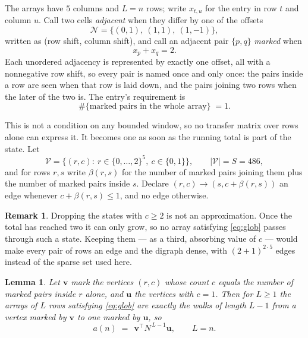 \documentclass[11pt,a4paper]{article}
\theoremstyle{plain}
\newtheorem{lemma}[theorem]{Lemma}
\theoremstyle{definition}
\newtheorem{remark}[theorem]{Remark}
\begin{document}
The arrays have $5$ columns and $L=n$ rows; write $x_{t,u}$ for the entry in
row $t$ and column $u$. Call two cells \emph{adjacent} when they differ by one of the
offsets
\[
\mathcal N=\{(0,1),\ (1,1),\ (1,-1)\},
\]
written as (row shift, column shift), and call an adjacent pair $\{p,q\}$
\emph{marked} when
\[
x_{p}+x_{q}=2 .
\]
Each unordered adjacency is represented by exactly one offset, all with a nonnegative row
shift, so every pair is named once and only once: the pairs inside a row are seen when
that row is laid down, and the pairs joining two rows when the later of the two is. The
entry's requirement is
\begin{equation}\label{eq:glob}
\#\{\text{marked pairs in the whole array}\}\;=1.
\end{equation}

This is not a condition on any bounded window, so no transfer matrix over rows alone can
express it. It becomes one as soon as the running total is part of the state. Let
\[
\mathcal V=\bigl\{(r,c):\ r\in\{0,\dots,2\}^{5},\ c\in\{0,1\}\bigr\},
\qquad |\mathcal V|=S=486,
\]
and for rows $r,s$ write $\beta(r,s)$ for the number of marked pairs joining them plus the
number of marked pairs inside $s$. Declare $(r,c)\to(s,c+\beta(r,s))$ an edge whenever
$c+\beta(r,s)\le1$, and no edge otherwise.

\begin{remark}
Dropping the states with $c\ge2$ is not an approximation. Once the total has reached two it
can only grow, so no array satisfying \eqref{eq:glob} passes through such a state. Keeping
them --- as a third, absorbing value of $c$ --- would make every pair of rows an edge and
the digraph dense, with $(2+1)^{2\cdot5}$ edges instead of the sparse set used here.
\end{remark}

\begin{lemma}\label{lem:walk}
Let $\mathbf{v}$ mark the vertices $(r,c)$ whose count $c$ equals the number of marked pairs
inside $r$ alone, and $\mathbf{u}$ the vertices with $c=1$. Then for $L\ge1$ the arrays
of $L$ rows satisfying \eqref{eq:glob} are exactly the walks of length $L-1$ from a
vertex marked by $\mathbf{v}$ to one marked by $\mathbf{u}$, so
\[
a(n)\;=\;\,\mathbf{v}^{\!\top}N^{\,L-1}\mathbf{u},\qquad L=n .
\]
\end{lemma}
\end{document}
